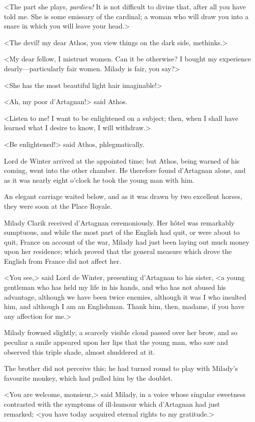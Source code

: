 <The part she plays, \textit{pardieu!} It is not difficult to divine that, after all you have told me. She is some emissary of the cardinal; a woman who will draw you into a snare in which you will leave your head.> 

<The devil! my dear Athos, you view things on the dark side, methinks.> 

<My dear fellow, I mistrust women. Can it be otherwise? I bought my experience dearly---particularly fair women. Milady is fair, you say?> 

<She has the most beautiful light hair imaginable!> 

<Ah, my poor d'Artagnan!> said Athos. 

<Listen to me! I want to be enlightened on a subject; then, when I shall have learned what I desire to know, I will withdraw.> 

<Be enlightened!> said Athos, phlegmatically. 

Lord de Winter arrived at the appointed time; but Athos, being warned of his coming, went into the other chamber. He therefore found d'Artagnan alone, and as it was nearly eight o'clock he took the young man with him. 

An elegant carriage waited below, and as it was drawn by two excellent horses, they were soon at the Place Royale. 

Milady Clarik received d'Artagnan ceremoniously. Her hôtel was remarkably sumptuous, and while the most part of the English had quit, or were about to quit, France on account of the war, Milady had just been laying out much money upon her residence; which proved that the general measure which drove the English from France did not affect her. 

<You see,> said Lord de Winter, presenting d'Artagnan to his sister, <a young gentleman who has held my life in his hands, and who has not abused his advantage, although we have been twice enemies, although it was I who insulted him, and although I am an Englishman. Thank him, then, madame, if you have any affection for me.> 

Milady frowned slightly; a scarcely visible cloud passed over her brow, and so peculiar a smile appeared upon her lips that the young man, who saw and observed this triple shade, almost shuddered at it. 

The brother did not perceive this; he had turned round to play with Milady's favourite monkey, which had pulled him by the doublet. 

<You are welcome, monsieur,> said Milady, in a voice whose singular sweetness contrasted with the symptoms of ill-humour which d'Artagnan had just remarked; <you have today acquired eternal rights to my gratitude.> 


